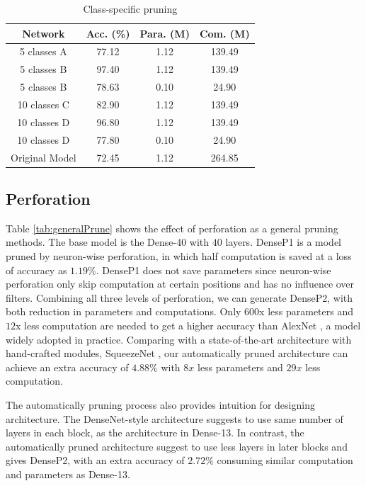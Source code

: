 \documentclass[pageno]{jpaper}
\begin{document}
\begin{table}
    \caption{Class-specific pruning}
    \label{tab:csPruning}

    \centering
    \begin{tabular}{ c|c|cc } 
     \hline
     Network & Acc. (\%) & Para. (M) & Com. (M) \\ 
     \hline
     5 classes A & 77.12 & 1.12 & 139.49 \\
     5 classes B & 97.40 & 1.12 & 139.49 \\
     5 classes B & 78.63 & 0.10 & 24.90 \\
     \hline
     10 classes C & 82.90 & 1.12 & 139.49 \\
     10 classes D & 96.80 & 1.12 & 139.49 \\
     10 classes D & 77.80 & 0.10 & 24.90 \\
     \hline
     Original Model & 72.45 & 1.12 & 264.85 \\
     \hline
    \end{tabular}
\end{table}


\subsection{Perforation}
Table \ref{tab:generalPrune} shows the effect of perforation as a general pruning methods. The base model is the Dense-40 \cite{huang2017densely} with $40$ layers. DenseP1 is a model pruned by neuron-wise perforation, in which half computation is saved at a loss of accuracy as $1.19\%$. DenseP1 does not save parameters since neuron-wise perforation only skip computation at certain positions and has no influence over filters. Combining all three levels of perforation, we can generate DenseP2, with both reduction in parameters and computations. Only $600$x less parameters and $12$x less computation are needed to get a higher accuracy than AlexNet \cite{NIPS2012_4824}, a model widely adopted in practice. Comparing with a state-of-the-art architecture with hand-crafted modules, SqueezeNet \cite{iandola2016squeezenet}, our automatically pruned architecture can achieve an extra accuracy of $4.88\%$ with $8x$ less parameters and $29x$ less computation. 

The automatically pruning process also provides intuition for designing architecture. The DenseNet-style architecture suggests to use same number of layers in each block, as the architecture in Dense-13. In contrast, the automatically pruned architecture suggest to use less layers in later blocks and gives DenseP2, with an extra accuracy of $2.72\%$ consuming similar computation and parameters as Dense-13.
\end{document}
